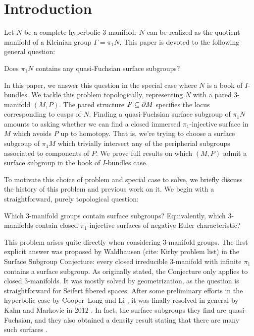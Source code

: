 \section{Introduction}

Let $N$ be a complete hyperbolic 3-manifold. $N$ can be realized as the
quotient manifold of a Kleinian group $\Gamma=\pi_1N$. This paper is devoted to
the following general question:

\begin{prob}

Does $\pi_1N$ contains any quasi-Fuchsian surface subgroups?

\end{prob}

In this paper, we answer this question in the special case where $N$ is a book
of $I$-bundles. We tackle this problem topologically, representing $N$ with
a pared 3-manifold $(M,P)$.  The pared structure $P\subseteq\partial M$ specifies the
locus corresponding to cusps of $N$. Finding a quasi-Fuchsian surface subgroup
of $\pi_1N$ amounts to asking whether we can find a closed immersed
$\pi_1$-injective surface in $M$ which avoids $P$ up to homotopy.  That is,
we're trying to choose a surface subgroup of $\pi_1M$ which trivially intersect
any of the peripherial subgroups associated to components of $P$. We prove full
results on which $(M,P)$ admit a surface subgroup in the book of $I$-bundles
case.

To motivate this choice of problem and special case to solve, we briefly
discuss the history of this problem and previous work on it. We begin with
a straightforward, purely topological question:

\begin{prob}

Which 3-manifold groups contain surface subgroups? Equivalently, which
3-manifolds contain closed $\pi_1$-injective surfaces of negative Euler
characteristic?

\end{prob}

This problem arises quite directly when considering 3-manifold groups. The
first explicit answer was proposed by Waldhausen (cite: Kirby problem list) in
the Surface Subgroup Conjecture: every closed irreducible 3-manifold with
infinite $\pi_1$ contains a surface subgroup. As originally stated, the
Conjecture only applies to closed 3-manifolds. It was mostly solved by
geometrization, as the question is straightforward for Seifert fibered spaces.
After some preliminary efforts in the hyperbolic case by Cooper--Long
\cite{CooperLong} and Li \cite{Li}, it was finally resolved in general by Kahn
and Markovic in 2012 \cite{KM}.  In fact, the surface subgroups they find are
quasi-Fuchsian, and they also obtained a density result stating that there are
many such surfaces \cite{KM2}.


